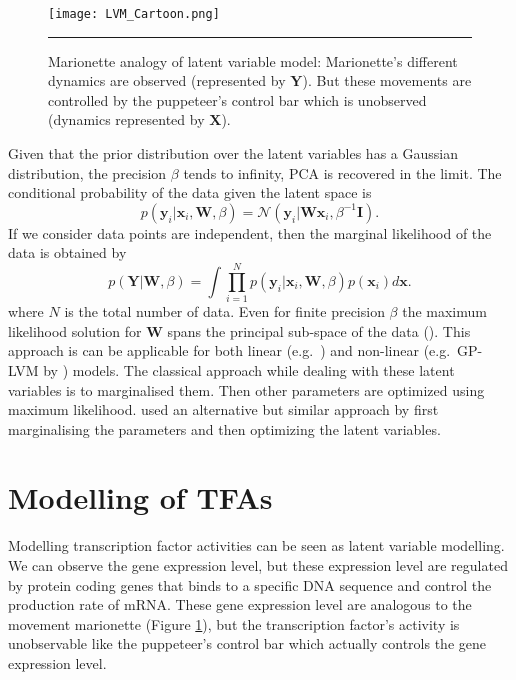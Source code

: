 \begin{figure}
	\centering
		\texttt{[image: LVM\_Cartoon.png]}
		\rule{35em}{0.5pt}
	\caption[Marionette analogy of latent variable model]
		{Marionette analogy of latent variable model: Marionette's different dynamics are observed (represented by $\textbf{Y}$). But these movements are controlled by the puppeteer's control bar which is unobserved (dynamics represented by $\textbf{X}$).}
	\label{fig:LVM_Cartoon}
\end{figure}

Given that the prior distribution over the latent variables has a Gaussian distribution, the precision $\beta$ tends to infinity, PCA is recovered in the limit. The conditional probability of the data given the latent space is
\begin{equation} \label{eq:cond_prob_latent_space}
p\left(\textbf{y}_i|\textbf{x}_i,\textbf{W},\beta \right) = \mathcal{N} \left(\textbf{y}_i|\textbf{W}\textbf{x}_i,\beta^{-1}\textbf{I}\right).
\end{equation}
If we consider data points are independent, then the marginal likelihood of the data is obtained by
\begin{equation} \label{eq:marginal_likelihood_latent_space}
p\left(\textbf{Y}|\textbf{W},\beta \right) = 
\int \prod^{N}_{i=1} p\left(\textbf{y}_i|\textbf{x}_i,\textbf{W},\beta\right)p\left(\textbf{x}_i\right)d\textbf{x}.
\end{equation}
where $N$ is the total number of data. Even for finite precision $\beta$ the maximum likelihood solution for $\textbf{W}$ spans the principal sub-space of the data (\cite{Tipping:1999}). This approach is can be applicable for both linear (e.g.\ \cite{Silva:2006}) and non-linear (e.g.\ GP-LVM by \cite{Lawrence:2005}) models. The classical approach while dealing with these latent variables is to marginalised them. Then other parameters are optimized using maximum likelihood. \cite{Lawrence:2005} used an alternative but similar approach by first marginalising the parameters and then optimizing the latent variables.

\section{Modelling of TFAs}
Modelling transcription factor activities can be seen as latent variable modelling. We can observe the gene expression level, but these expression level are regulated by protein coding genes that binds to a specific DNA sequence and control the production rate of mRNA. These gene expression level are analogous to the movement marionette (Figure \ref{fig:LVM_Cartoon}), but the transcription factor's activity is unobservable like the puppeteer's control bar which actually controls the gene expression level.

